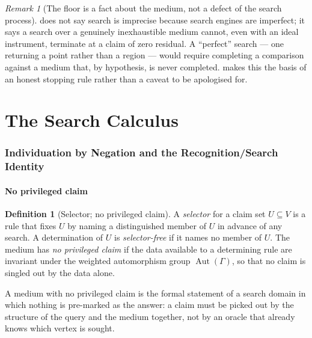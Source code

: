 \documentclass[11pt,twocolumn,a4paper]{article}
\theoremstyle{thmstyle}
\theoremstyle{definition}
\newtheorem{definition}[theorem]{Definition}
\theoremstyle{remark}
\newtheorem{remark}[theorem]{Remark}
\newcommand{\Gph}{\Gamma}
\newcommand{\V}{V}
\begin{document}
\begin{remark}[The floor is a fact about the medium, not a defect of the
search process]
\label{rem:floor-fact}
 does not say search is imprecise because search engines
are imperfect; it says a search over a genuinely inexhaustible medium
cannot, even with an ideal instrument, terminate at a claim of zero
residual. A ``perfect'' search --- one returning a point rather than a
region --- would require completing a comparison against a medium that,
by hypothesis, is never completed.  makes this the basis
of an honest stopping rule rather than a caveat to be apologised for.
\end{remark}

\part{The Search Calculus}

\section{Individuation by Negation and the Recognition/Search Identity}
\label{sec:individuation}

\subsection{No privileged claim}

\begin{definition}[Selector; no privileged claim]
\label{def:selector}
A \emph{selector} for a claim set $U\subseteq\V$ is a rule that fixes $U$
by naming a distinguished member of $U$ in advance of any search. A
determination of $U$ is \emph{selector-free} if it names no member of $U$.
The medium has \emph{no privileged claim} if the data available to a
determining rule are invariant under the weighted automorphism group
$\operatorname{Aut}(\Gph)$, so that no claim is singled out by the data
alone.
\end{definition}

A medium with no privileged claim is the formal statement of a search
domain in which nothing is pre-marked as the answer: a claim must be
picked out by the structure of the query and the medium together, not by
an oracle that already knows which vertex is sought.
\end{document}
